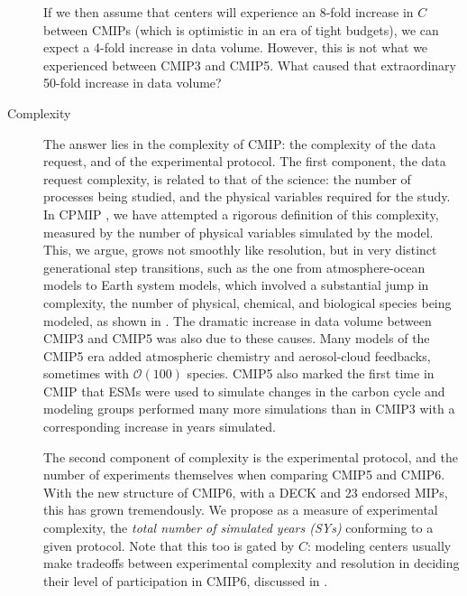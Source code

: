 \documentclass[gmd,manuscript]{copernicus}
\newcommand{\pllabel}[1]{\label{p-#1}\linelabel{l-#1}}
\begin{document}
\begin{description}
  If we then assume that centers will experience an 8-fold increase in
  $C$ between CMIPs (which is optimistic in an era of tight budgets),
  we can expect a 4-fold increase in data volume. However, this is not
  what we experienced between CMIP3 and CMIP5. What caused that
  extraordinary 50-fold increase in data volume?
\item[Complexity] The answer lies in the complexity of CMIP: the
  complexity of the data request, and of the experimental protocol.
  The first component, the
  \pllabel{RC1-19}
  data request complexity, is related to that of the science: the
  number of processes being studied, and the physical variables
  required for the study. In CPMIP \citep{ref:balajietal2017}, we have
  attempted a rigorous definition of this complexity, measured by the
  number of physical variables simulated by the model. This, we argue,
  grows not smoothly like resolution, but in very distinct
  generational step transitions, such as the one from atmosphere-ocean
  models to Earth system models, which involved a substantial jump in
  complexity, the number of physical, chemical, and biological species
  being modeled, as shown in \cite{ref:balajietal2017}.
  \pllabel{RC1-29a}
  The dramatic increase in data volume between CMIP3 and CMIP5 was
  also due to these causes. Many models of the CMIP5 era added
  atmospheric chemistry and aerosol-cloud feedbacks, sometimes with
  $\mathcal{O}(100)$ species. CMIP5 also marked the first time in CMIP
  that ESMs were used to simulate changes in the carbon cycle and
  modeling groups performed many more simulations than in CMIP3 with a
  corresponding increase in years simulated.

  The second component of complexity is the experimental protocol, and 
  the number of experiments themselves when comparing CMIP5 and CMIP6.
  With the new structure of CMIP6, with a DECK and 23 endorsed MIPs,
  this
  \pllabel{RC3-11}
  has grown tremendously. We propose as a measure of experimental
  complexity, the \emph{total number of simulated years (SYs)}
  conforming to a given protocol. Note that this too is gated by $C$:
  modeling centers usually make tradeoffs between experimental
  complexity and resolution in deciding their level of participation
  in CMIP6, discussed in \cite{ref:balajietal2017}.
\end{description}
\end{document}

